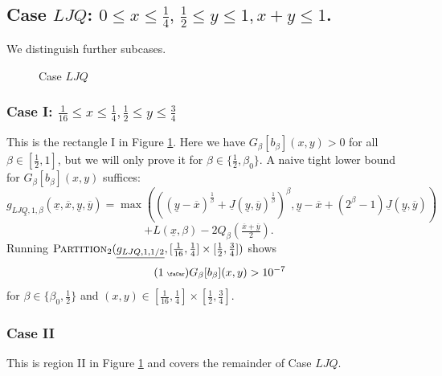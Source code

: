 \documentclass[12pt]{amsart}
\theoremstyle{plain}
\newcommand{\auto}{\tag{\addtocounter{equation}{1}\theequation\;{\tiny\faCar}}}
\theoremstyle{definition}
\theoremstyle{remark}
\numberwithin{equation}{section}
\begin{document}
\subsection{\texorpdfstring{Case $LJQ$: $0\leq x \leq \tfrac{1}{4},\,\tfrac{1}{2}\leq y \leq 1,x+y\leq 1$.}{Case LJQ}} 
\label{sec:caseLJQ}
We distinguish further subcases.
\begin{figure}[htb]
\centering
{}
\caption{Case $LJQ$}
\label{fig:ljq}
\end{figure}



\subsubsection{Case I: $\tfrac{1}{16}\leq x\leq \tfrac{1}{4}, \tfrac{1}{2}\leq y\leq \tfrac34$}
\label{sec:LJQ-I}
This is the rectangle I in Figure \ref{fig:ljq}. Here we have
$G_\beta[b_\beta](x,y)>0$ for all $\beta\in[\frac12,1]$, but we will only prove it for $\beta\in\{\frac12,\beta_0\}$.
A naive tight lower bound for $G_\beta[b_\beta](x,y)$ suffices:
\[ \underline{g_{LJQ,1,\beta}}(\underline{x},\overline{x},\underline{y},\overline{y})=
\max(((\underline{y}-\overline{x})^{\frac1\beta}+\underline{J}(\underline{y},\overline{y})^{\frac1\beta})^\beta, \underline{y}-\overline{x}+(2^\beta-1) \underline{J}(\underline{y},\overline{y})) \] 
\[ + L(\underline{x},\beta) - 2 Q_\beta(\tfrac{\overline{x}+\overline{y}}{2}).
\]
Running $\textsc{Partition}_2(\underline{g_{LJQ,1,1/2}},[\frac1{16},\frac14]\times[\frac12,\frac34])$ shows
\begin{equation}\label{eqn:g_LJQ_1_auto}\auto
G_\beta[b_\beta](x,y)>10^{-7}
\end{equation}
for $\beta\in\{\beta_0,\frac12\}$ and $(x,y)\in [\frac1{16},\frac14]\times[\frac12,\frac34]$.

\subsubsection{Case II}
\label{sec:LJQ-II}
This is region II in Figure \ref{fig:ljq} and covers the remainder of Case $LJQ$.
\end{document}
